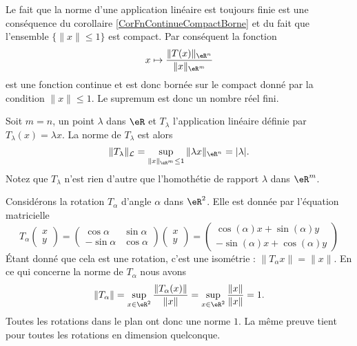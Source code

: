 Le fait que la norme d'une application linéaire est toujours finie est une conséquence du corollaire \ref{CorFnContinueCompactBorne} et du fait que l'ensemble $\{ \| x \|\leq 1 \}$ est compact. Par conséquent la fonction
\begin{equation}
	x\mapsto \frac{ \| T(x) \|_{\eR^n} }{ \| x \|_{\eR^m} }
\end{equation}
est une fonction continue et est donc bornée sur le compact donné par la condition $\| x \|\leq 1$. Le supremum est donc un nombre réel fini.

\begin{example}
	Soit $m=n$, un point $\lambda$ dans $\eR$ et $T_{\lambda}$ l'application linéaire définie par $T_{\lambda}(x)=\lambda x$. La norme de $T_{\lambda}$ est alors
\[
\|T_{\lambda}\|_{\mathcal{L}}=\sup_{\|x\|_{\eR^m}\leq 1}\|\lambda x\|_{\eR^n}= |\lambda|.
\]
Notez que $T_{\lambda}$ n'est rien d'autre que l'homothétie de rapport $\lambda$ dans $\eR^m$.
\end{example}

\begin{example}
	Considérons la rotation $T_{\alpha}$ d'angle $\alpha$ dans $\eR^2$. Elle est donnée par l'équation matricielle
	\begin{equation}
		T_{\alpha}\begin{pmatrix}
			x	\\ 
			y	
		\end{pmatrix}=\begin{pmatrix}
			\cos\alpha	&	\sin\alpha	\\ 
			-\sin\alpha	&	\cos\alpha	
		\end{pmatrix}\begin{pmatrix}
			x	\\ 
			y	
		\end{pmatrix}=\begin{pmatrix}
			\cos(\alpha)x+\sin(\alpha)y	\\ 
			-\sin(\alpha)x+\cos(\alpha)y	
		\end{pmatrix}
	\end{equation}
	Étant donné que cela est une rotation, c'est une isométrie : $\| T_{\alpha}x \|=\| x \|$. En ce qui concerne la norme de $T_{\alpha}$ nous avons
	\begin{equation}
		\| T_{\alpha} \|=\sup_{x\in\eR^2}\frac{ \| T_{\alpha}(x) \| }{ \| x \| }=\sup_{x\in\eR^2}\frac{ \| x \| }{ \| x \| }=1.
	\end{equation}
	Toutes les rotations dans le plan ont donc une norme $1$. La même preuve tient pour toutes les rotations en dimension quelconque. 
\end{example}

